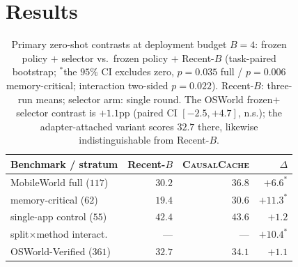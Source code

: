 \documentclass[letterpaper]{article} %
\newcommand{\method}{\textsc{CausalCache}}
\begin{document}
\section{Results}

\begin{table}[t]
\centering
{\small
\setlength{\tabcolsep}{3.2pt}
\begin{tabular}{@{}lrrr@{}}
\toprule
Benchmark / stratum & Recent-$B$ & \method{} & $\Delta$ \\
\midrule
MobileWorld full ($117$) & $30.2$ & $36.8$ & $+6.6^{*}$ \\
\hspace{7pt}memory-critical ($62$) & $19.4$ & $30.6$ & $+11.3^{*}$ \\
\hspace{7pt}single-app control ($55$) & $42.4$ & $43.6$ & $+1.2$ \\
\hspace{7pt}split$\times$method interact. & --- & --- & $+10.4^{*}$ \\
OSWorld-Verified ($361$) & $32.7$ & $34.1$ & $+1.1$ \\
\bottomrule
\end{tabular}
}
\caption{Primary zero-shot contrasts at deployment budget $B{=}4$:
frozen policy $+$ selector vs.\ frozen policy $+$ Recent-$B$ (task-paired
bootstrap; $^{*}$the $95\%$ CI excludes zero, $p{=}0.035$ full /
$p{=}0.006$ memory-critical; interaction two-sided $p{=}0.022$). Recent-$B$: three-run means; selector arm:
single round. The OSWorld frozen$+$selector contrast is $+1.1$pp
(paired CI $[-2.5,+4.7]$, n.s.); the adapter-attached variant scores
$32.7$ there, likewise indistinguishable from Recent-$B$.}
\label{tab:contrast}
\end{table}
\end{document}
